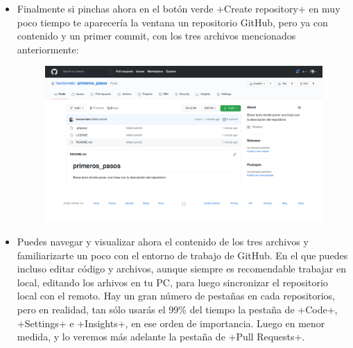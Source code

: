 \documentclass[a4paper,10pt]{article}
\begin{document}
\begin{itemize}
        \item Finalmente si pinchas ahora en el botón verde \cverb+Create repository+ en muy poco tiempo te aparecería la ventana un repositorio GitHub, pero ya con contenido y un primer commit, con los tres archivos mencionados anteriormente:
       
       \begin{figure}[H]
        \includegraphics[width=\columnwidth]{github_new_repo.png}
       \end{figure}
       
        \item Puedes navegar y visualizar ahora el contenido de los tres archivos y familiarizarte un poco con el entorno de trabajo de GitHub. En el que puedes incluso editar código y archivos, aunque siempre es recomendable trabajar en local, editando los arhivos en tu PC, para luego sincronizar el repositorio local con el remoto. Hay un gran número de pestañas en cada repositorios, pero en realidad, tan sólo usarás el 99\% del tiempo la pestaña de \cverb+Code+, \cverb+Settings+ e \cverb+Insights+, en ese orden de importancia. Luego en menor medida, y lo veremos más adelante la pestaña de \cverb+Pull Requests+.
       \end{itemize}
    
\end{document}
